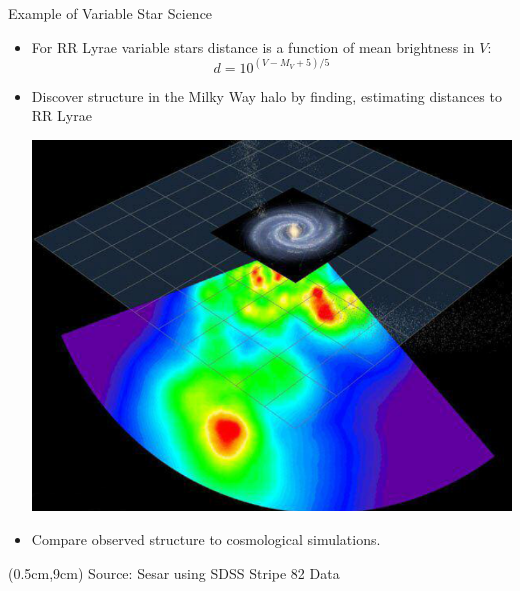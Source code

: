 \documentclass[12pt]{beamer}
\newcommand{\att}[1]{\begin{textblock*}{12cm}(0.5cm,9cm) %
  {\tiny Source: #1}
      \end{textblock*}}
\begin{document}
\begin{frame}{Example of Variable Star Science}
\begin{itemize}
\item For RR Lyrae variable stars distance is a function of mean brightness in $V$:
\begin{equation*}
d = 10^{(V-M_V +5)/5}
\end{equation*}
\item Discover structure in the Milky Way halo by finding, estimating distances to RR Lyrae


\begin{center}
\includegraphics[scale=.2]{figs/sesar_map.png}\\

\end{center}

\item Compare observed structure to cosmological simulations.

\end{itemize}

\att{Sesar \cite{sesar2010light} using SDSS Stripe 82 Data}

\end{frame}



\end{document}
